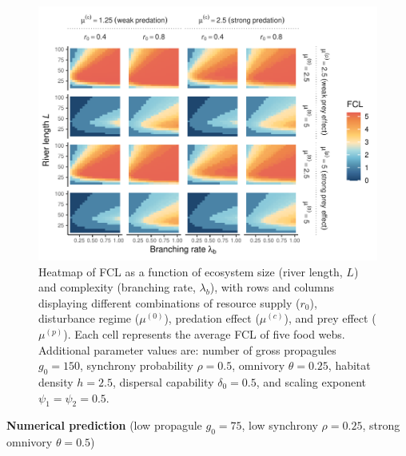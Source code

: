 \begin{figure}
\centering
\includegraphics{../data_fmt/fig_rho05_g150_theta025.pdf}
\caption{Heatmap of FCL as a function of ecosystem size (river length,
\(L\)) and complexity (branching rate, \(\lambda_b\)), with rows and
columns displaying different combinations of resource supply (\(r_0\)),
disturbance regime (\(\mu^{(0)}\)), predation effect (\(\mu^{(c)}\)),
and prey effect (\(\mu^{(p)}\)). Each cell represents the average FCL of
five food webs. Additional parameter values are: number of gross
propagules \(g_0=150\), synchrony probability \(\rho=0.5\), omnivory
\(\theta=0.25\), habitat density \(h=2.5\), dispersal capability
\(\delta_0=0.5\), and scaling exponent \(\psi_1=\psi_2=0.5\).}
\end{figure}

\newpage

\textbf{Numerical prediction} (low propagule \(g_0 = 75\), low synchrony
\(\rho = 0.25\), strong omnivory \(\theta = 0.5\))

